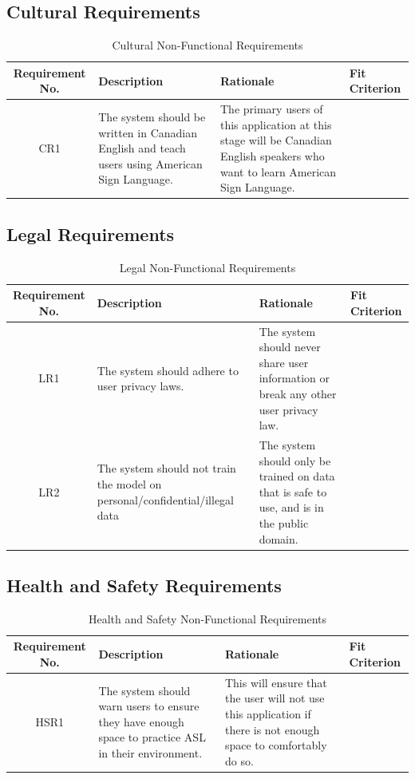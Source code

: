 \documentclass[12pt, titlepage]{article}
\begin{document}
\subsection{Cultural Requirements}

\begin{table}[H]
\caption{Cultural Non-Functional Requirements}
\noindent \begin{tabular}{| c | p{3cm}| p{3cm}| p{3cm}|}
\hline 
\textbf{Requirement No.} & \textbf{Description} & \textbf{Rationale} & \textbf{Fit Criterion}\\
\hline
CR1 & The system should be written in Canadian English and teach users using American Sign Language. & The primary users of this application at this stage will be Canadian English speakers who want to learn American Sign Language. & \\
\bottomrule
\end{tabular}
\end{table}

\subsection{Legal Requirements}

\begin{table}[H]
\caption{Legal Non-Functional Requirements}
\noindent \begin{tabular}{| c | p{3cm}| p{3cm}| p{3cm}|}
\hline 
\textbf{Requirement No.} & \textbf{Description} & \textbf{Rationale} & \textbf{Fit Criterion}\\
\hline
LR1 & The system should adhere to user privacy laws. &  The system should never share user information or break any other user privacy law. & \\
\hline
LR2 & The system should not train the model on personal/confidential/illegal data & The system should only be trained on data that is safe to use, and is in the public domain. & \\
\bottomrule
\end{tabular}
\end{table}

\subsection{Health and Safety Requirements}

\begin{table}[H]
\caption{Health and Safety Non-Functional Requirements}
\noindent \begin{tabular}{| c | p{3cm}| p{3cm}| p{3cm}|}
\hline 
\textbf{Requirement No.} & \textbf{Description} & \textbf{Rationale} & \textbf{Fit Criterion}\\
\hline
HSR1 & The system should warn users to ensure they have enough space to practice ASL in their environment. & This will ensure that the user will not use this application if there is not enough space to comfortably do so. & \\
\bottomrule
\end{tabular}
\end{table}
\end{document}
